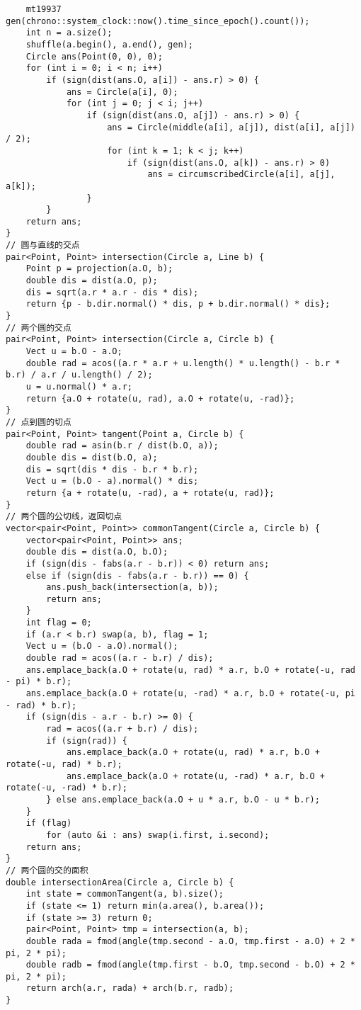 \begin{verbatim}
    mt19937 gen(chrono::system_clock::now().time_since_epoch().count());
    int n = a.size();
    shuffle(a.begin(), a.end(), gen);
    Circle ans(Point(0, 0), 0);
    for (int i = 0; i < n; i++)
        if (sign(dist(ans.O, a[i]) - ans.r) > 0) {
            ans = Circle(a[i], 0);
            for (int j = 0; j < i; j++)
                if (sign(dist(ans.O, a[j]) - ans.r) > 0) {
                    ans = Circle(middle(a[i], a[j]), dist(a[i], a[j]) / 2);
                    for (int k = 1; k < j; k++)
                        if (sign(dist(ans.O, a[k]) - ans.r) > 0)
                            ans = circumscribedCircle(a[i], a[j], a[k]);
                }
        }
    return ans;
}
// 圆与直线的交点
pair<Point, Point> intersection(Circle a, Line b) {
    Point p = projection(a.O, b);
    double dis = dist(a.O, p);
    dis = sqrt(a.r * a.r - dis * dis);
    return {p - b.dir.normal() * dis, p + b.dir.normal() * dis};
}
// 两个圆的交点
pair<Point, Point> intersection(Circle a, Circle b) {
    Vect u = b.O - a.O;
    double rad = acos((a.r * a.r + u.length() * u.length() - b.r * b.r) / a.r / u.length() / 2);
    u = u.normal() * a.r;
    return {a.O + rotate(u, rad), a.O + rotate(u, -rad)};
}
// 点到圆的切点
pair<Point, Point> tangent(Point a, Circle b) {
    double rad = asin(b.r / dist(b.O, a));
    double dis = dist(b.O, a);
    dis = sqrt(dis * dis - b.r * b.r);
    Vect u = (b.O - a).normal() * dis;
    return {a + rotate(u, -rad), a + rotate(u, rad)};
}
// 两个圆的公切线，返回切点
vector<pair<Point, Point>> commonTangent(Circle a, Circle b) {
    vector<pair<Point, Point>> ans;
    double dis = dist(a.O, b.O);
    if (sign(dis - fabs(a.r - b.r)) < 0) return ans;
    else if (sign(dis - fabs(a.r - b.r)) == 0) {
        ans.push_back(intersection(a, b));
        return ans;
    }
    int flag = 0;
    if (a.r < b.r) swap(a, b), flag = 1;
    Vect u = (b.O - a.O).normal();
    double rad = acos((a.r - b.r) / dis);
    ans.emplace_back(a.O + rotate(u, rad) * a.r, b.O + rotate(-u, rad - pi) * b.r);
    ans.emplace_back(a.O + rotate(u, -rad) * a.r, b.O + rotate(-u, pi - rad) * b.r);
    if (sign(dis - a.r - b.r) >= 0) {
        rad = acos((a.r + b.r) / dis);
        if (sign(rad)) {
            ans.emplace_back(a.O + rotate(u, rad) * a.r, b.O + rotate(-u, rad) * b.r);
            ans.emplace_back(a.O + rotate(u, -rad) * a.r, b.O + rotate(-u, -rad) * b.r);
        } else ans.emplace_back(a.O + u * a.r, b.O - u * b.r);
    }
    if (flag)
        for (auto &i : ans) swap(i.first, i.second);
    return ans;
}
// 两个圆的交的面积
double intersectionArea(Circle a, Circle b) {
    int state = commonTangent(a, b).size();
    if (state <= 1) return min(a.area(), b.area());
    if (state >= 3) return 0;
    pair<Point, Point> tmp = intersection(a, b);
    double rada = fmod(angle(tmp.second - a.O, tmp.first - a.O) + 2 * pi, 2 * pi);
    double radb = fmod(angle(tmp.first - b.O, tmp.second - b.O) + 2 * pi, 2 * pi);
    return arch(a.r, rada) + arch(b.r, radb);
}
\end{verbatim}